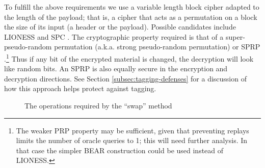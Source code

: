 \documentclass[11pt]{IEEEtran}
\begin{document}
To fulfill the above requirements we use a variable length block
cipher adapted to the length of the payload; that
is, a cipher that acts as a permutation on a block the size of its
input (a header or the payload).  Possible candidates
include LIONESS \cite{BEAR-LIONESS} and SPC \cite{SPC}.
The cryptographic property required is that of a super-pseudo-random
permutation (a.k.a. strong pseudo-random permutation) or SPRP \cite{sprp}.\footnote{
The weaker PRP property may be sufficient, given that preventing
replays limits the number of oracle queries to 1; this will need
further analysis.  In that case the simpler BEAR construction
\cite{BEAR-LIONESS} could be used instead of LIONESS.}
Thus if any bit of
the encrypted material is changed, the decryption will look like random
bits.  An SPRP is also equally secure in the encryption and decryption
directions.  See Section \ref{subsec:tagging-defenses} for a
discussion of how this approach helps protect against tagging.


%


\begin{figure}
\begin{center}
\caption{The operations required by the ``swap'' method} 
\end{center}
\end{figure}
\end{document}
